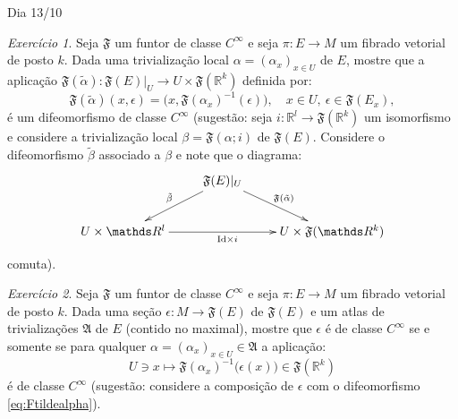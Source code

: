 \documentclass[oneside,11pt]{amsart}
\newcommand{\R}{\mathds R}
\newcommand{\Id}{\mathrm{Id}}
\theoremstyle{remark}\newtheorem{exercise}{Exercício}[section]
\theoremstyle{plain}\newtheorem{teo}{Teorema}[section]
\theoremstyle{plain}\newtheorem{lem}[teo]{Lema}
\theoremstyle{plain}\newtheorem{prop}[teo]{Proposição}
\theoremstyle{definition}\newtheorem{defin}[teo]{Definição}
\theoremstyle{remark}\newtheorem{rem}[teo]{Observação}
\theoremstyle{definition}\newtheorem{example}[teo]{Exemplo}
\numberwithin{equation}{section}
\begin{document}
\begin{section}{Dia 13/10}
\begin{exercise}
Seja $\mathfrak F$ um funtor de classe $C^\infty$ e seja $\pi:E\to M$ um fibrado vetorial de posto $k$.
Dada uma trivialização local $\alpha=(\alpha_x)_{x\in U}$ de $E$,
mostre que a aplicação $\mathfrak F(\tilde\alpha):\mathfrak F(E)\vert_U\to U\times\mathfrak F(\R^k)$ definida por:
\begin{equation}\label{eq:Ftildealpha}
\mathfrak F(\tilde\alpha)(x,\epsilon)=\big(x,\mathfrak F(\alpha_x)^{-1}(\epsilon)\big),\quad x\in U,\ \epsilon\in\mathfrak F(E_x),
\end{equation}
é um difeomorfismo de classe $C^\infty$ (sugestão: seja $i:\R^l\to\mathfrak F(\R^k)$ um isomorfismo e considere a trivialização local
$\beta=\mathfrak F(\alpha;i)$ de $\mathfrak F(E)$. Considere o difeomorfismo $\tilde\beta$ associado a $\beta$ e note que o diagrama:
\[\xymatrix{%
&\mathfrak F(E)\vert_U\ar[dl]_{\tilde\beta}\ar[dr]^{\mathfrak F(\tilde\alpha)}\\
U\times\R^l\ar[rr]_{\Id\times i}&&U\times\mathfrak F(\R^k)}\]
comuta).
\end{exercise}

\begin{exercise}\label{exe:secaoFEsmooth}
Seja $\mathfrak F$ um funtor de classe $C^\infty$ e seja $\pi:E\to M$ um fibrado vetorial de posto $k$. Dada uma seção $\epsilon:M\to\mathfrak F(E)$
de $\mathfrak F(E)$ e um atlas de trivializações $\mathfrak A$ de $E$ (contido no maximal), mostre que $\epsilon$ é de classe $C^\infty$ se e somente se
para qualquer $\alpha=(\alpha_x)_{x\in U}\in\mathfrak A$ a aplicação:
\begin{equation}\label{eq:repreepsilonF}
U\ni x\longmapsto\mathfrak F(\alpha_x)^{-1}\big(\epsilon(x)\big)\in\mathfrak F(\R^k)
\end{equation}
é de classe $C^\infty$ (sugestão: considere a composição de $\epsilon$ com o difeomorfismo \eqref{eq:Ftildealpha}).
\end{exercise}


\end{section}
\end{document}

